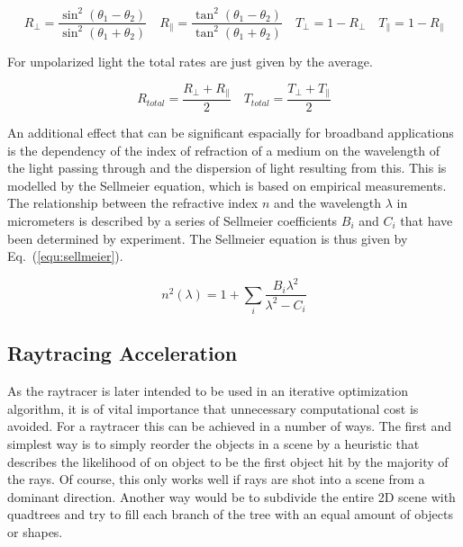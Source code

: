 \documentclass[a4paper,10pt]{article}
\newcommand{\equref}[1]{Eq.~(\ref{#1})}
\begin{document}
    \begin{equation}
        \label{equ:fresnel}
		R_{\perp} = \frac{\sin^2(\theta_1 - \theta_2)}{\sin^2(\theta_1 + \theta_2)} \quad
		R_{\parallel} = \frac{\tan^2(\theta_1 - \theta_2)}{\tan^2(\theta_1 + \theta_2)} \quad
		T_{\perp} = 1 - R_{\perp} \quad
		T_{\parallel} = 1 - R_{\parallel}
    \end{equation}

    For unpolarized light the total rates are just given by the average.
    
    \begin{equation}
        \label{equ:fresnel_unpolarized}
		R_{total} = \frac{R_{\perp} + R_{\parallel}}{2} \quad
		T_{total} = \frac{T_{\perp} + T_{\parallel}}{2}
    \end{equation}
    
    An additional effect that can be significant espacially for broadband
    applications is the dependency of the index of refraction of a medium
    on the wavelength of the light passing through and the dispersion
    of light resulting from this.
    This is modelled by the Sellmeier equation, which is based on 
    empirical measurements.
    The relationship between the refractive index $n$ and the wavelength 
    $\lambda$ in micrometers is described by a series of Sellmeier coefficients $B_i$ and
    $C_i$ that have been determined by experiment.
    The Sellmeier equation is thus given by \equref{equ:sellmeier}.

    \begin{equation}
        \label{equ:sellmeier}
        n^2(\lambda) = 1 + \sum_i \frac{B_i \lambda^2}{\lambda^2 - C_i}
    \end{equation}

    \subsection{Raytracing Acceleration} \label{sec:raytracing_acceleration}

    As the raytracer is later intended to be used in an iterative optimization
    algorithm, it is of vital importance that unnecessary computational cost 
    is avoided.
    For a raytracer this can be achieved in a number of ways.
    The first and simplest way is to simply reorder the objects in a scene
    by a heuristic that describes the likelihood of on object to be the
    first object hit by the majority of the rays.
    Of course, this only works well if rays are shot into a scene from
    a dominant direction.
    Another way would be to subdivide the entire 2D scene with quadtrees
    and try to fill each branch of the tree with an equal amount of 
    objects or shapes.
    
\end{document}
